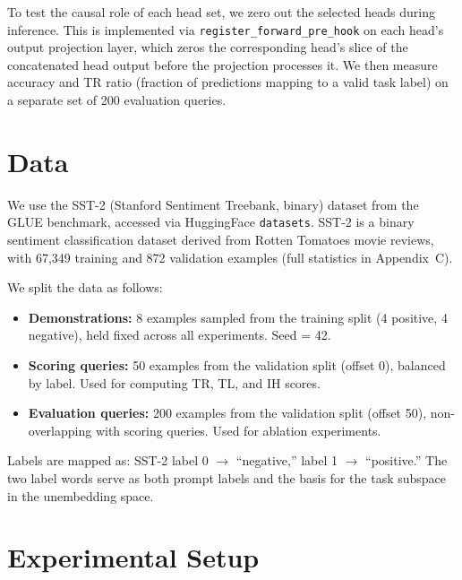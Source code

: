 \documentclass[twoside,english]{article}
\begin{document}
To test the causal role of each head set, we zero out the selected heads during inference. This is implemented via \texttt{register\_forward\_pre\_hook} on each head's output projection layer, which zeros the corresponding head's slice of the concatenated head output before the projection processes it. We then measure accuracy and TR ratio (fraction of predictions mapping to a valid task label) on a separate set of 200 evaluation queries.

\section{Data} \label{sec:data}

We use the SST-2 (Stanford Sentiment Treebank, binary) dataset from the GLUE benchmark, accessed via HuggingFace \texttt{datasets}. SST-2 is a binary sentiment classification dataset derived from Rotten Tomatoes movie reviews, with 67,349 training and 872 validation examples (full statistics in Appendix~C).

We split the data as follows:
\begin{itemize}
    \item \textbf{Demonstrations:} 8 examples sampled from the training split (4 positive, 4 negative), held fixed across all experiments. Seed = 42.
    \item \textbf{Scoring queries:} 50 examples from the validation split (offset 0), balanced by label. Used for computing TR, TL, and IH scores.
    \item \textbf{Evaluation queries:} 200 examples from the validation split (offset 50), non-overlapping with scoring queries. Used for ablation experiments.
\end{itemize}

Labels are mapped as: SST-2 label 0 $\to$ ``negative,'' label 1 $\to$ ``positive.'' The two label words serve as both prompt labels and the basis for the task subspace in the unembedding space.

\section{Experimental Setup} \label{sec:setup}
\end{document}
